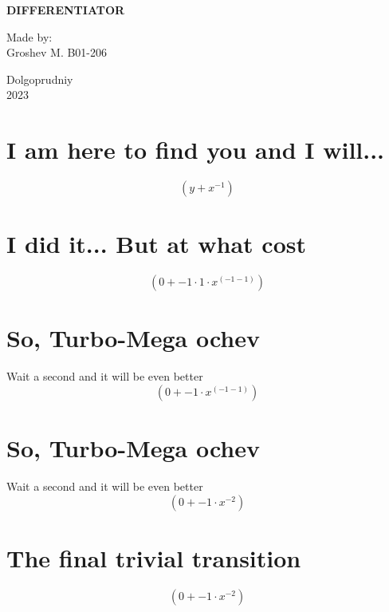 \documentclass[a4paper, 12pt]{article}
\title{}
\date{}
\begin{document}

    \begin{titlepage}
    \maketitle
    \thispagestyle{empty}

            \begin{center}
                  \Large \textbf{DIFFERENTIATOR}
            \end{center}

             \vspace{20em}
             \begin{flushright}
                 \normalsize Made by: \\
                             Groshev M. B01-206
             \end{flushright}

             \begin{center}
                    \vfill \normalsize Dolgoprudniy \\ 2023
             \end{center}
    \end{titlepage}


\section{I am here to find you and I will...}\begin{equation*}
    ({{y}}+{{{x}}^{{-1}}})
\end{equation*}

\section{I did it... But at what cost}\begin{equation*}
    ({{0}}+{{{-1}}\cdot{{{1}}\cdot{{{x}}^{({{-1}}-{{1}})}}}})
\end{equation*}

\section{So, Turbo-Mega ochev}
 Wait a second and it will be even better
\begin{equation*}
    ({{0}}+{{{-1}}\cdot{{{x}}^{({{-1}}-{{1}})}}})
\end{equation*}

\section{So, Turbo-Mega ochev}
 Wait a second and it will be even better
\begin{equation*}
    ({{0}}+{{{-1}}\cdot{{{x}}^{{-2}}}})
\end{equation*}

\section{The final trivial transition}\begin{equation*}
    ({{0}}+{{{-1}}\cdot{{{x}}^{{-2}}}})
\end{equation*}
\end{document}
